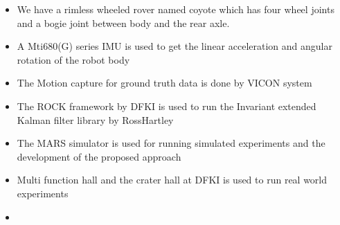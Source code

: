 \documentclass[report.tex]{subfiles}
\begin{document}
    \begin{itemize}
        \item We have a rimless wheeled rover named coyote which has four wheel joints and a bogie joint between body and the rear axle. 
        \item A Mti680(G) \cite{DT-IMU-datasheet} series IMU is used to get the linear acceleration and angular rotation of the robot body
        \item The Motion capture for ground truth data is done by VICON system 
        \item The ROCK framework by DFKI \cite{SW-rockrobotics} is used to run the Invariant extended Kalman filter library \cite{REPO-inekf-github} by RossHartley 
        \item The MARS simulator is used for running simulated experiments and the development of the proposed approach 
        \item Multi function hall and the crater hall at DFKI is used to run real world experiments
        \item {}

    \end{itemize} 
\end{document}
